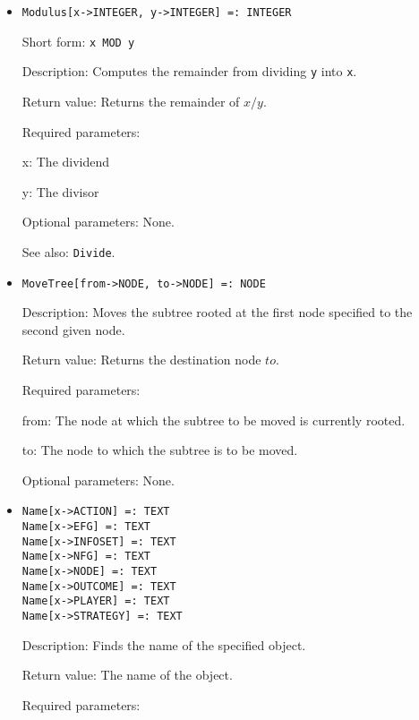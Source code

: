 \begin{itemize}
\item
\protect \large \begin{verbatim}
Modulus[x->INTEGER, y->INTEGER] =: INTEGER
\end{verbatim}\normalsize

\bd
\item
[Short form:] \verb+x MOD y+
\item
[Description:] Computes the remainder from dividing \verb+y+ into \verb+x+.
\item
[Return value:] Returns the remainder of $x / y$.
\item
[Required parameters:]\hfil\null

\bd
\item
[x:] The dividend
\item
[y:] The divisor
\ed

\item
[Optional parameters:] None.
\item
[See also:] \verb+Divide+.
\ed


\item
\protect \large \begin{verbatim}
MoveTree[from->NODE, to->NODE] =: NODE
\end{verbatim}\normalsize

\bd
\item
[Description:] Moves the subtree rooted at the first node specified to
the second given node.
\item
[Return value:] Returns the destination node $to$.
\item
[Required parameters:]\hfil\null
	  
\bd
\item
[from:] The node at which the subtree to be moved is currently rooted.
\item
[to:] The node to which the subtree is to be moved.
\ed

\item
[Optional parameters:] None.
\ed


\item
\protect \large \begin{verbatim}
Name[x->ACTION] =: TEXT
Name[x->EFG] =: TEXT
Name[x->INFOSET] =: TEXT
Name[x->NFG] =: TEXT
Name[x->NODE] =: TEXT
Name[x->OUTCOME] =: TEXT
Name[x->PLAYER] =: TEXT
Name[x->STRATEGY] =: TEXT
\end{verbatim}\normalsize

\bd
\item
[Description:] Finds the name of the specified object.
\item
[Return value:] The name of the object.
\item
[Required parameters:]\hfil\null


\end{itemize}
